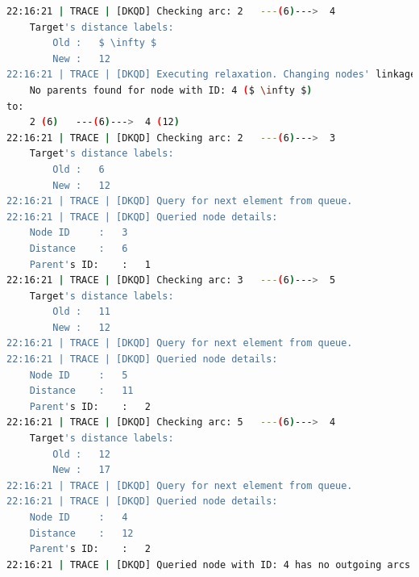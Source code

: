 \begin{lstlisting}[mathescape,language=bash]
22:16:21 | TRACE | [DKQD] Checking arc:	2	---(6)--->	4
	Target's distance labels:
		Old	:	$ \infty $
		New	:	12
22:16:21 | TRACE | [DKQD] Executing relaxation. Changing nodes' linkage from:
	No parents found for node with ID: 4 ($ \infty $)
to:
	2 (6)	---(6)--->	4 (12)
22:16:21 | TRACE | [DKQD] Checking arc:	2	---(6)--->	3
	Target's distance labels:
		Old	:	6
		New	:	12
22:16:21 | TRACE | [DKQD] Query for next element from queue.
22:16:21 | TRACE | [DKQD] Queried node details:
	Node ID		:	3
	Distance	:	6
	Parent's ID:	:	1
22:16:21 | TRACE | [DKQD] Checking arc:	3	---(6)--->	5
	Target's distance labels:
		Old	:	11
		New	:	12
22:16:21 | TRACE | [DKQD] Query for next element from queue.
22:16:21 | TRACE | [DKQD] Queried node details:
	Node ID		:	5
	Distance	:	11
	Parent's ID:	:	2
22:16:21 | TRACE | [DKQD] Checking arc:	5	---(6)--->	4
	Target's distance labels:
		Old	:	12
		New	:	17
22:16:21 | TRACE | [DKQD] Query for next element from queue.
22:16:21 | TRACE | [DKQD] Queried node details:
	Node ID		:	4
	Distance	:	12
	Parent's ID:	:	2
22:16:21 | TRACE | [DKQD] Queried node with ID: 4 has no outgoing arcs.
\end{lstlisting}
\normalsize
